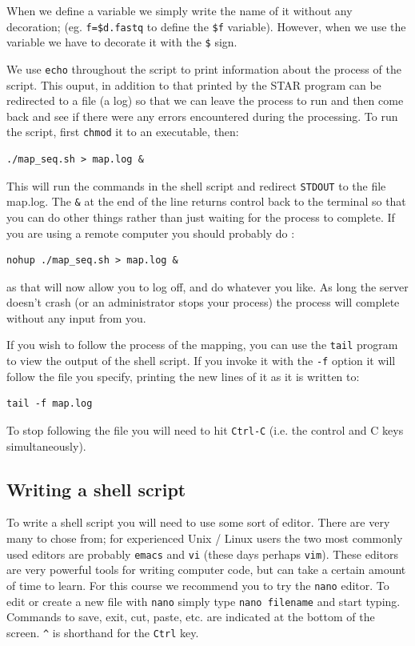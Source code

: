 \documentclass[11pt]{article}
\begin{document}
When we define a variable we simply write the name of it without any
decoration; (eg. \texttt{f=\$d.fastq} to define the \texttt{\$f} variable). However, when we
use the variable we have to decorate it with the \texttt{\$} sign.

We use \texttt{echo} throughout the script to print
information about the process of the script. This ouput, in addition to that
printed by the STAR program can be redirected to a file (a log) so that we
can leave the process to run and then come back and see if there were any
errors encountered during the processing. To run the script, first \texttt{chmod} it
to an executable, then:

\begin{verbatim}
./map_seq.sh > map.log &
\end{verbatim}

This will run the commands in the shell script and redirect \texttt{STDOUT} to the
file map.log. The \texttt{\&} at the end of the line returns control back to the
terminal so that you can do other things rather than just waiting for the
process to complete.
If you are using a remote computer you should probably do :

\begin{verbatim}
nohup ./map_seq.sh > map.log &
\end{verbatim}

as that will now allow you to log off, and do whatever you like. As long the
server doesn't crash (or an administrator stops your process) the process
will complete without any input from you.

If you wish to follow the process of the mapping, you can use the
\texttt{tail} program to view the output of the shell script. If you invoke
it with the \texttt{-f} option it will follow the file you specify, printing
the new lines of it as it is written to:

\begin{verbatim}
tail -f map.log
\end{verbatim}

To stop following the file you will need to hit \texttt{Ctrl-C} (i.e. the
control and C keys simultaneously).

\subsection{Writing a shell script}
\label{sec-3-3}
To write a shell script you will need to use some sort of editor. There are
very many to chose from; for experienced Unix / Linux users the two most
commonly used editors are probably \texttt{emacs} and \texttt{vi} (these days perhaps
\texttt{vim}). These editors are very powerful tools for writing computer code, but
can take a certain amount of time to learn. For this course we recommend you
to try the \texttt{nano} editor. To edit or create a new file with \texttt{nano} simply
type \texttt{nano filename} and start typing. Commands to save, exit, cut, paste,
etc. are indicated at the bottom of the screen. \texttt{\textasciicircum{}} is shorthand for the
\texttt{Ctrl} key.
\end{document}
